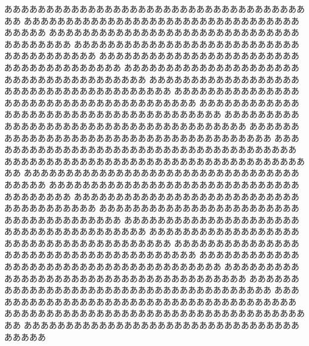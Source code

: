 \documentclass{classes/resume}
\begin{document}
ああああああああああああああああああああああああああああああああああああああ
ああああああああああああああああああああああああああああああああああああああ
ああああああああああああああああああああああああああああああああああああああ
ああああああああああああああああああああああああああああああああああああああ
ああああああああああああああああああああああああああああああああああああああ
ああああああああああああああああああああああああああああああああああああああ
ああああああああああああああああああああああああああああああああああああああ
ああああああああああああああああああああああああああああああああああああああ
ああああああああああああああああああああああああああああああああああああああ
ああああああああああああああああああああああああああああああああああああああ
ああああああああああああああああああああああああああああああああああああああ
ああああああああああああああああああああああああああああああああああああああ
ああああああああああああああああああああああああああああああああああああああ
ああああああああああああああああああああああああああああああああああああああ
ああああああああああああああああああああああああああああああああああああああ
ああああああああああああああああああああああああああああああああああああああ
ああああああああああああああああああああああああああああああああああああああ
ああああああああああああああああああああああああああああああああああああああ
ああああああああああああああああああああああああああああああああああああああ
ああああああああああああああああああああああああああああああああああああああ
ああああああああああああああああああああああああああああああああああああああ
ああああああああああああああああああああああああああああああああああああああ
ああああああああああああああああああああああああああああああああああああああ
ああああああああああああああああああああああああああああああああああああああ
ああああああああああああああああああああああああああああああああああああああ
ああああああああああああああああああああああああああああああああああああああ



\end{document}
